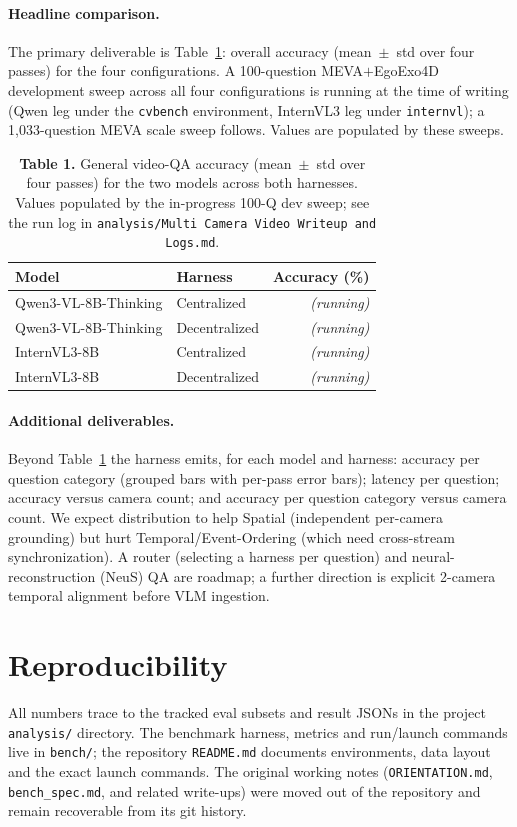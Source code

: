 \documentclass[11pt]{article}
\begin{document}
\paragraph{Headline comparison.} The primary deliverable is Table~\ref{tab:table1}: overall accuracy
(mean~$\pm$~std over four passes) for the four configurations. A 100-question MEVA$+$EgoExo4D
development sweep across all four configurations is running at the time of writing (Qwen leg under the
\texttt{cvbench} environment, InternVL3 leg under \texttt{internvl}); a 1{,}033-question MEVA scale
sweep follows. Values are populated by these sweeps.

\begin{table}[h]
\centering
\caption{\textbf{Table 1.} General video-QA accuracy (mean~$\pm$~std over four passes) for the two
models across both harnesses. Values populated by the in-progress 100-Q dev sweep; see the run log in
\texttt{analysis/Multi Camera Video Writeup and Logs.md}.}
\label{tab:table1}
\begin{tabular}{llr}
\toprule
Model & Harness & Accuracy (\%) \\
\midrule
Qwen3-VL-8B-Thinking & Centralized   & \emph{(running)} \\
Qwen3-VL-8B-Thinking & Decentralized & \emph{(running)} \\
InternVL3-8B         & Centralized   & \emph{(running)} \\
InternVL3-8B         & Decentralized & \emph{(running)} \\
\bottomrule
\end{tabular}
\end{table}

\paragraph{Additional deliverables.} Beyond Table~\ref{tab:table1} the harness emits, for each model
and harness: accuracy per question category (grouped bars with per-pass error bars); latency per
question; accuracy versus camera count; and accuracy per question category versus camera count. We
expect distribution to help Spatial (independent per-camera grounding) but hurt
Temporal/Event-Ordering (which need cross-stream synchronization). A router (selecting a harness per
question) and neural-reconstruction (NeuS) QA are roadmap; a further direction is explicit 2-camera
temporal alignment before VLM ingestion.

\section*{Reproducibility}
All numbers trace to the tracked eval subsets and result JSONs in the project
\texttt{analysis/} directory. The benchmark harness, metrics and run/launch commands live in
\texttt{bench/}; the repository \texttt{README.md} documents environments, data layout and the
exact launch commands. The original working notes (\texttt{ORIENTATION.md},
\texttt{bench\_spec.md}, and related write-ups) were moved out of the repository and remain
recoverable from its git history.
\end{document}
